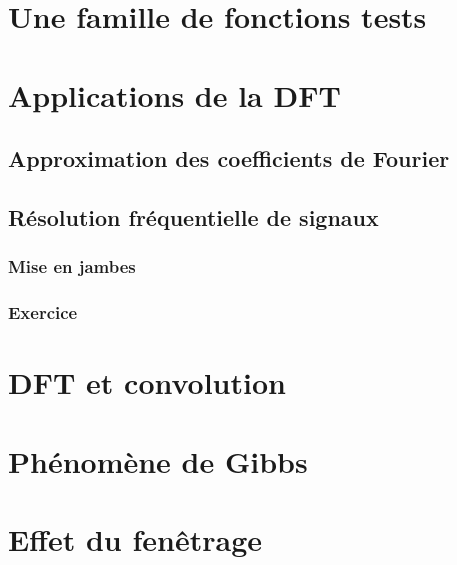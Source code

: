 \documentclass[a4paper,12pt]{report}
\begin{document}
\chapter{Une famille de fonctions tests}

\chapter{Applications de la DFT}

	\section{Approximation des coefficients de Fourier}

	\section{R\'esolution fr\'equentielle de signaux}

		\subsection{Mise en jambes}

		\subsection{Exercice}

\chapter{DFT et convolution}

\chapter{Ph\'enom\`ene de Gibbs}

\chapter{Effet du fen\^etrage}

\listoffigures
\end{document}
